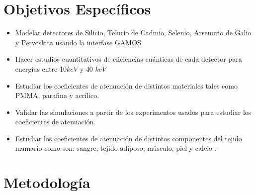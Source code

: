\documentclass[12pt]{article}
\begin{document}
\section{Objetivos Específicos}


\begin{itemize}
	\item Modelar detectores de Silicio, Telurio de Cadmio, Selenio, Arsenurio de Galio y Pervoskita usando la interfase GAMOS.

\item Hacer estudios cuantitativos de eficiencias cuánticas de cada detector para energías entre 10$keV$ y 40 $keV$ 

	\item Estudiar los coeficientes de atenuación de distintos materiales tales como PMMA, parafina y acrílico.     

\item Validar las simulaciones a partir de los experimentos usados para estudiar los coeficientes de atenuación.

\item Estudiar los coeficientes de atenuación de distintos componentes del tejido mamario como son: sangre, tejido adiposo, músculo, piel y calcio .     


      
\end{itemize}

\section{Metodología}


\end{document}
